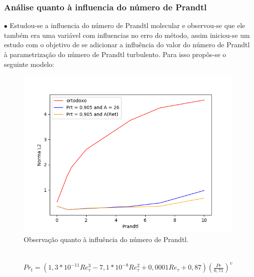 \documentclass[xcolor=dvipsnames,10pt,aspectratio=169]{beamer}
\begin{document}
		\begin{frame}
		\frametitle{Análise quanto à influencia do número de Prandtl}
		\begin{minipage}[h!]{0.45\textwidth}
		$\bullet$ Estudou-se a influencia do número de Prandtl molecular e observou-se que ele também era uma variável com influencias no erro do método, assim iniciou-se um estudo com o objetivo de se adicionar a influência do valor do número de Prandtl à parametrização do número de Prandtl turbulento. Para isso propôs-se o seguinte modelo:
		\end{minipage}\hfill
		\begin{minipage}[h!]{0.45\textwidth}
		\begin{figure}
			\centering
			\includegraphics[angle=0, scale=0.38]{analisepr}
			\caption{Observação quanto à influência do número de Prandtl.}
		\end{figure}
		\end{minipage}\\
		\begin{equation}
	\begin{split}
	Pr_t = \left( 1,3 * 10^{-11} Re_\tau^3 - 7,1 * 10^{-8} Re_\tau^2 + 0,0001 Re_\tau + 0,87 \right) \left(  \frac{Pr}{0,71}\right) ^{v}
	\end{split}
	\end{equation}
		\end{frame}
	
	
	
\end{document}

